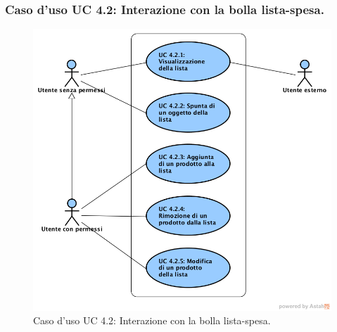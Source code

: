 \subsubsection{Caso d'uso UC 4.2: Interazione con la bolla lista-spesa.}
\label{Caso d'uso UC 4.2: Interazione con la bolla lista-spesa.}
\begin{figure}[ht]
	\centering
	\includegraphics[scale=0.55]{Usecases/img/UC4.2.png}
	\caption{Caso d'uso UC 4.2: Interazione con la bolla lista-spesa.}
\end{figure}

